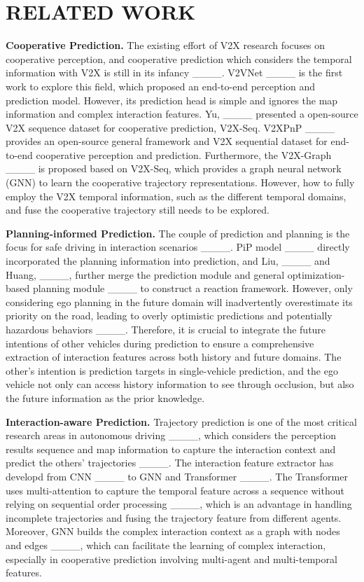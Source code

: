 \section{RELATED WORK}
\noindent \textbf{Cooperative Prediction.} The existing effort of V2X research focuses on cooperative perception, and cooperative prediction which considers the temporal information with V2X is still in its infancy ____. V2VNet ____ is the first work to explore this field, which proposed an end-to-end perception and prediction model. However, its prediction head is simple and ignores the map information and complex interaction features. Yu, \etal ____ presented a open-source V2X sequence dataset for cooperative prediction, V2X-Seq. V2XPnP ____ provides an open-source general framework and V2X sequential dataset for end-to-end cooperative perception and prediction. Furthermore, the V2X-Graph ____ is proposed based on V2X-Seq, which provides a graph neural network (GNN) to learn the cooperative trajectory representations. However, how to fully employ the V2X temporal information, such as the different temporal domains, and fuse the cooperative trajectory still needs to be explored.

\noindent \textbf{Planning-informed Prediction.} The couple of prediction and planning is the focus for safe driving in interaction scenarios ____. PiP model ____ directly incorporated the planning information into prediction, and Liu, \etal ____ and Huang, \etal ____, further merge the prediction module and general optimization-based  planning module ____ to construct a reaction framework. However, only considering ego planning in the future domain will inadvertently overestimate its priority on the road, leading to overly optimistic predictions and potentially hazardous behaviors ____. Therefore, it is crucial to integrate the future intentions of other vehicles during prediction to ensure a comprehensive extraction of interaction features across both history and future domains. The other's intention is prediction targets in single-vehicle prediction, and the ego vehicle not only can access history information to see through occlusion, but also the future information as the prior knowledge.


\noindent \textbf{Interaction-aware Prediction.} Trajectory prediction is one of the most critical research areas in autonomous driving ____, which considers the perception results sequence and map information to capture the interaction context and predict the others' trajectories ____. The interaction feature extractor has developd from CNN ____ to GNN and Transformer ____. The Transformer uses multi-attention to capture the temporal feature across a sequence without relying on sequential order processing ____, which is an advantage in handling incomplete trajectories and fusing the trajectory feature from different agents. Moreover, GNN builds the complex interaction context as a graph with nodes and edges ____, which can facilitate the learning of complex interaction, especially in cooperative prediction involving multi-agent and multi-temporal features.